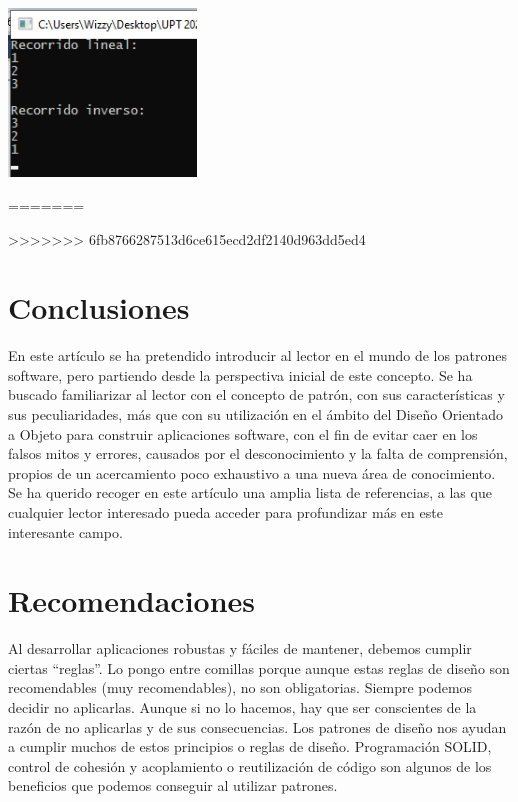 \documentclass[twoside,twocolumn]{article}
\begin{document}
\begin{itemize}
\begin{itemize}
\begin{itemize}
\begin{center}
    \end{center}
    \begin{center}
        \includegraphics[width=5cm]{./img/Iterator5.png} 
    \end{center}
=======

>>>>>>> 6fb8766287513d6ce615ecd2df2140d963dd5ed4
\section{Conclusiones}
\begin{itemize}
    En este artículo se ha pretendido introducir al lector en el mundo de los patrones software, pero partiendo desde la perspectiva inicial de este concepto.
    Se ha buscado familiarizar al lector con el concepto de patrón, con sus características y sus peculiaridades, más que con su utilización en el ámbito del Diseño Orientado a Objeto para construir aplicaciones software, con el fin de evitar caer en los falsos mitos y errores, causados por el desconocimiento y la falta de comprensión, propios de un acercamiento poco exhaustivo a una nueva área de conocimiento. 
    Se ha querido recoger en este artículo una amplia lista de referencias, a las que cualquier lector interesado pueda acceder para profundizar más en este interesante campo.
\end{itemize}


\section{Recomendaciones}
\begin{itemize}
	Al desarrollar aplicaciones robustas y fáciles de mantener, debemos cumplir ciertas “reglas”. Lo pongo entre comillas porque aunque estas reglas de diseño son recomendables (muy recomendables), no son obligatorias. Siempre podemos decidir no aplicarlas. Aunque si no lo hacemos, hay que ser conscientes de la razón de no aplicarlas y de sus consecuencias.
Los patrones de diseño nos ayudan a cumplir muchos de estos principios o reglas de diseño. Programación SOLID, control de cohesión y acoplamiento o reutilización de código son algunos de los beneficios que podemos conseguir al utilizar patrones.


\end{itemize}
\end{itemize}
\end{itemize}
\end{itemize}
\end{document}
